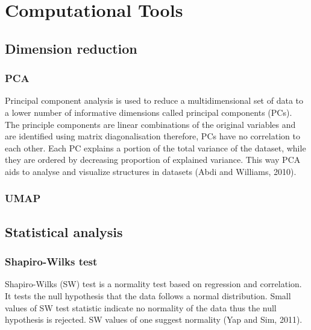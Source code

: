 \documentclass[
  parskip,
  oneside]{scrreprt}
\begin{document}
\hypertarget{computational-tools}{%
\section{Computational Tools}\label{computational-tools}}

\hypertarget{dimension-reduction}{%
\subsection{Dimension reduction}\label{dimension-reduction}}

\hypertarget{pca}{%
\subsubsection{PCA}\label{pca}}

Principal component analysis is used to reduce a multidimensional set of
data to a lower number of informative dimensions called principal
components (PCs). The principle components are linear combinations of
the original variables and are identified using matrix diagonalisation
therefore, PCs have no correlation to each other. Each PC explains a
portion of the total variance of the dataset, while they are ordered by
decreasing proportion of explained variance. This way PCA aids to
analyse and visualize structures in datasets (Abdi and Williams, 2010).

\hypertarget{umap}{%
\subsubsection{UMAP}\label{umap}}

\hypertarget{statistical-analysis}{%
\subsection{Statistical analysis}\label{statistical-analysis}}

\hypertarget{shapiro-wilks-test}{%
\subsubsection{Shapiro-Wilks test}\label{shapiro-wilks-test}}

Shapiro-Wilks (SW) test is a normality test based on regression and
correlation. It tests the null hypothesis that the data follows a normal
distribution. Small values of SW test statistic indicate no normality of
the data thus the null hypothesis is rejected. SW values of one suggest
normality (Yap and Sim, 2011).
\end{document}

